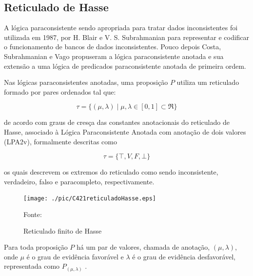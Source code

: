 


\subsection{Reticulado de Hasse}

A lógica paraconsistente sendo apropriada para tratar dados inconsistentes foi utilizada em 1987, por H. Blair e V. S. Subrahmanian para representar e codificar o funcionamento de bancos de dados inconsistentes. Pouco depois Costa, Subrahmanian e Vago propuseram a lógica paraconsistente anotada e sua extensão a uma lógica de predicados paraconsistente anotada de primeira ordem. 

Nas lógicas paraconsistentes anotadas, uma proposição $P$ utiliza um reticulado formado por pares ordenados tal que: 

\begin{center}
\begin{equation}
\tau = \{ ( \mu , \lambda ) \mid \mu ,\lambda \in [0,1] \subset \Re \}
\end{equation}
\end{center}

de acordo com graus de cresça das constantes anotacionais do reticulado de Hasse, associado à Lógica Paraconsistente Anotada com anotação de dois valores (LPA2v), formalmente descritas como 

\begin{center}
\begin{equation}
  \tau = \{ \top , V, F, \bot \}
\end{equation}
\end{center}

os quais descrevem os extremos do reticulado como sendo inconsistente, verdadeiro, falso e paracompleto, respectivamente. 

\begin{figure}[!htb]
\centering
\caption{Reticulado finito de Hasse}
\center\texttt{[image: ./pic/C421reticuladoHasse.eps]}
\label{fig:reticuladoHasse}

{\small Fonte: \cite{JoaoInacio}}
\end{figure}

Para toda proposição $P$ há um par de valores, chamada de anotação, $(\mu , \lambda )$, onde $\mu$ é o grau de evidência favorável e $\lambda $ é o grau de evidência desfavorável, representada como  $P_{( \mu , \lambda )}$ .

